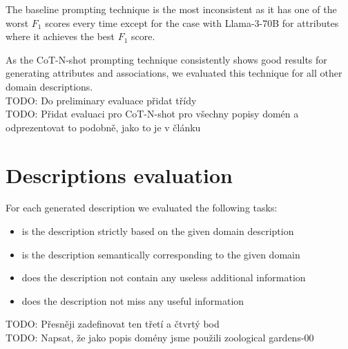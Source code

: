 The baseline prompting technique is the most inconsistent as it has one of the worst $F_1$ scores every time except for the case with Llama-3-70B for attributes where it achieves the best $F_1$ score.

As the CoT-N-shot prompting technique consistently shows good results for generating attributes and associations, we evaluated this technique for all other domain descriptions. \\

\noindent{}TODO: Do preliminary evaluace přidat třídy \\

\noindent{}TODO: Přidat evaluaci pro CoT-N-shot pro všechny popisy domén a odprezentovat to podobně, jako to je v článku


\section{Descriptions evaluation}

For each generated description we evaluated the following tasks:
\begin{itemize}
\item is the description strictly based on the given domain description
\item is the description semantically corresponding to the given domain
\item does the description not contain any useless additional information
\item does the description not miss any useful information \\
\end{itemize}

\noindent{}TODO: Přesněji zadefinovat ten třetí a čtvrtý bod \\

\noindent{}TODO: Napsat, že jako popis domény jsme použili zoological gardens-00

%


